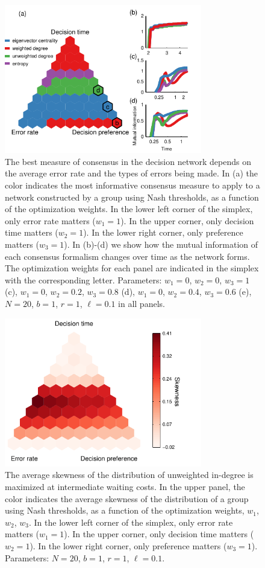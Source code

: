 \documentclass{pnastwo}
\begin{document}
\begin{figure}[ht]
\includegraphics[width=3.4in]{Figure3.pdf}
\caption{\label{bestmetric} The best measure of consensus in the decision network depends on the average error rate and the types of errors being made.  In (a) the color indicates the most informative consensus measure to apply to a network constructed by a group using Nash thresholds, as a function of the optimization weights. In the lower left corner of the simplex, only error rate matters ($w_1=1$).  In the upper corner, only decision time matters ($w_2=1$).  In the lower right corner, only preference matters ($w_3=1$). In (b)-(d) we show how the mutual information of each consensus formalism changes over time as the network forms. The optimization weights for each panel are indicated in the simplex with the corresponding letter. Parameters: $w_1=0$, $w_2=0$, $w_3=1$ (c), $w_1=0$, $w_2=0.2$, $w_3=0.8$ (d), $w_1=0$, $w_2=0.4$, $w_3=0.6$ (e),  $N=20$, $b=1$, $r=1$, $\ell=0.1$ in all panels.}
\end{figure}


\begin{figure}[ht]
\includegraphics[width=3.4in]{Figure4}
\caption{\label{skewness} The average skewness of the distribution of unweighted in-degree is maximized at intermediate waiting costs. In the upper panel, the color indicates the average skewness of the distribution of a group using Nash thresholds, as a function of the optimization weights, $w_1$, $w_2$, $w_3$. In the lower left corner of the simplex, only error rate matters ($w_1=1$).  In the upper corner, only decision time matters ($w_2=1$).  In the lower right corner, only preference matters ($w_3=1$). Parameters: $N=20$, $b=1$, $r=1$, $\ell=0.1$.}
\end{figure}
\end{document}
